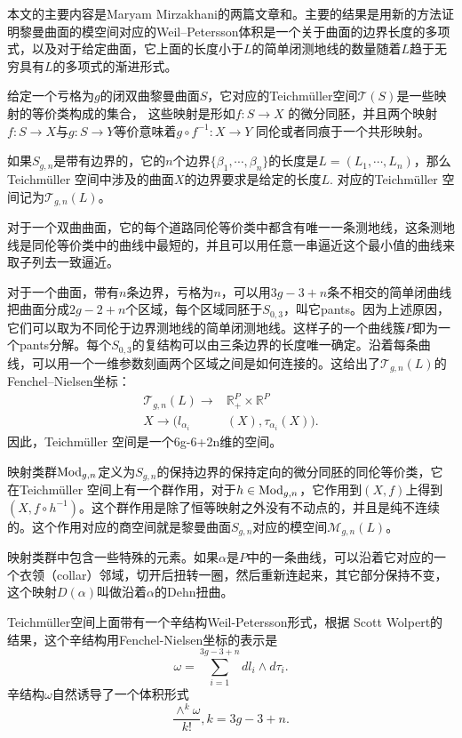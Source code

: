 \newtheorem{thmb}{Theorem B}

\hspace*{2em}%
本文的主要内容是Maryam Mirzakhani的两篇文章\cite{Mirzakhani:2006fta}和\cite{growthofsimple}。主要的结果是用新的方法证明黎曼曲面的模空间对应的Weil--Petersson体积是一个关于曲面的边界长度的多项式，以及对于给定曲面，它上面的长度小于$L$的简单闭测地线的数量随着$L$趋于无穷具有$L$的多项式的渐进形式。

给定一个亏格为$g$的闭双曲黎曼曲面$S$，它对应的Teichm\"uller空间$\mathscr{T}(S)$是一些映射的等价类构成的集合， 这些映射是形如$f:S\to X$ 的微分同胚，并且两个映射$f:S\to X$与$g:S\to Y$等价意味着$g\circ f^{-1}:X\to Y$ 同伦或者同痕于一个共形映射。 

如果$S_{g,n}$是带有边界的，它的$n$个边界$\{\beta_1,\cdots,\beta_n\}$的长度是$L=(L_1,\cdots,L_n)$，那么Teichm\"uller 空间中涉及的曲面$X$的边界要求是给定的长度$L.$ 对应的Teichm\"uller 空间记为$\mathscr{T}_{g,n}(L)$。

对于一个双曲曲面，它的每个道路同伦等价类中都含有唯一一条测地线，这条测地线是同伦等价类中的曲线中最短的，并且可以用任意一串逼近这个最小值的曲线来取子列去一致逼近。

对于一个曲面，带有$n$条边界，亏格为$n$，可以用$3g-3+n$条不相交的简单闭曲线把曲面分成$2g-2+n$个区域，每个区域同胚于$S_{0,3}$，叫它pants。因为上述原因，它们可以取为不同伦于边界测地线的简单闭测地线。这样子的一个曲线簇$P$即为一个pants分解。每个$S_{0,3}$的复结构可以由三条边界的长度唯一确定。沿着每条曲线，可以用一个一维参数刻画两个区域之间是如何连接的。这给出了$\mathscr{T}_{g,n}(L)$的Fenchel--Nielsen坐标：
\begin{align*}
\mathscr{T}_{g,n}(L)\to & \mathbb{R}_+^P\times \mathbb{R}^P\\
X\to (l_{\alpha_i}&(X),\tau_{\alpha_i}(X)). 
\end{align*}
因此，Teichm\"uller 空间是一个6g-6+2n维的空间。

映射类群$\operatorname{Mod}_{g,n}$定义为$S_{g,n}$的保持边界的保持定向的微分同胚的同伦等价类，它在Teichm\"uller 空间上有一个群作用，对于$h\in \operatorname{Mod}_{g,n}$，它作用到$(X,f)$上得到$(X,f\circ h^{-1})$。这个群作用是除了恒等映射之外没有不动点的，并且是纯不连续的。这个作用对应的商空间就是黎曼曲面$S_{g,n}$对应的模空间$\mathscr{M}_{g,n}(L)$。

映射类群中包含一些特殊的元素。如果$\alpha$是$P$中的一条曲线，可以沿着它对应的一个衣领（collar）邻域，切开后扭转一圈，然后重新连起来，其它部分保持不变，这个映射$D(\alpha)$叫做沿着$\alpha$的Dehn扭曲。

Teichm\"uller空间上面带有一个辛结构Weil-Petersson形式，根据 Scott Wolpert的结果\cite{wolpertformula}，这个辛结构用Fenchel-Nielsen坐标的表示是
$$
\omega=\sum_{i=1}^{3g-3+n}dl_i\wedge d\tau_i.
$$
辛结构$\omega$自然诱导了一个体积形式$$
\frac{\wedge^k\omega}{k!}, k=3g-3+n.
$$

